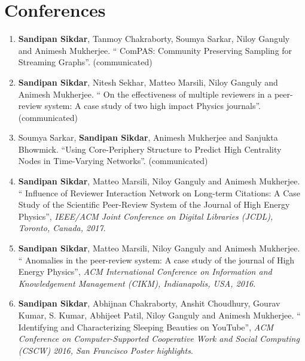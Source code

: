 \section*{Conferences}
\begin{enumerate}

\item  {\bf Sandipan Sikdar}, Tanmoy Chakraborty, Soumya Sarkar, Niloy Ganguly and Animesh Mukherjee. `` ComPAS: Community Preserving Sampling for Streaming Graphs''. (communicated)

\item  {\bf Sandipan Sikdar}, Nitesh Sekhar, Matteo Marsili, Niloy Ganguly and Animesh Mukherjee. `` On the effectiveness of multiple reviewers in a peer-review system: A case study of two high impact Physics journals''. (communicated)

\item  Soumya Sarkar, {\bf Sandipan Sikdar}, Animesh Mukherjee and Sanjukta Bhowmick. ``Using Core-Periphery Structure to Predict High Centrality Nodes in Time-Varying Networks''. (communicated)

\item  {\bf Sandipan Sikdar}, Matteo Marsili, Niloy Ganguly and Animesh Mukherjee. `` Influence of Reviewer Interaction Network on Long-term Citations: A Case Study of the Scientific Peer-Review System of the Journal of High Energy Physics'', 
  {\em IEEE/ACM Joint Conference on Digital Libraries (JCDL), Toronto, Canada, 2017}.
  
\item  {\bf Sandipan Sikdar}, Matteo Marsili, Niloy Ganguly and Animesh Mukherjee. `` Anomalies in the peer-review system: A case study of the journal of High Energy Physics'', {\em ACM International Conference on 
Information and Knowledgement Management (CIKM), Indianapolis, USA, 2016}.

\item  {\bf Sandipan Sikdar}, Abhijnan Chakraborty, Anshit Choudhury, Gourav Kumar, S. Kumar, Abhijeet Patil, Niloy Ganguly and Animesh Mukherjee. `` Identifying and Characterizing Sleeping Beauties on YouTube'', {\em ACM Conference on Computer-Supported Cooperative Work and Social Computing (CSCW) 2016, San Francisco Poster highlights}.
  
\end{enumerate}


